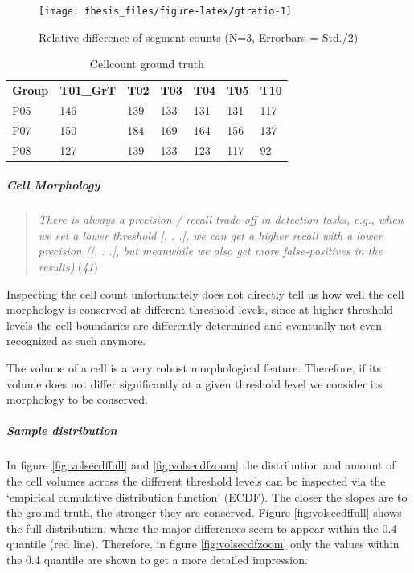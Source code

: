 \documentclass[11pt,singlespacinge,twoside]{reedthesis} %
\begin{document}
\begin{figure}

{\centering \texttt{[image: thesis\_files/figure-latex/gtratio-1]} 

}

\caption[Relative difference of segment counts]{Relative difference of segment counts (N=3, Errorbars = Std./2)}\label{fig:gtratio}
\end{figure}
\begin{table}[!h]

\caption{\label{tab:gtrcellcount}Cellcount ground truth}
\centering
\begin{tabu} to 
\toprule
{}  \textbf{Group} & \textbf{T01\_GrT} & \textbf{T02} & \textbf{T03} & \textbf{T04} & \textbf{T05} & \textbf{T10}\\
P05 & 146 & 139 & 133 & 131 & 131 & 117\\
  P07 & 150 & 184 & 169 & 164 & 156 & 137\\
P08 & 127 & 139 & 133 & 123 & 117 & 92\\
\bottomrule
\end{tabu}
\end{table}
\hypertarget{cell-morphology}{%
\subparagraph{Cell Morphology}\label{cell-morphology}}
\begin{quote}
\emph{There is always a precision / recall trade-off in detection tasks, e.g., when we set a lower threshold {[}. . .{]}, we can get a higher recall with a lower precision ({[}. . .{]}, but meanwhile we also get more false-positives in the results).}(\emph{41})
\end{quote}
Inspecting the cell count unfortunately does not directly tell us how well the cell morphology is conserved at different threshold levels, since at higher threshold levels the cell boundaries are differently determined and eventually not even recognized as such anymore.

\noindent The volume of a cell is a very robust morphological feature. Therefore, if its volume does not differ significantly at a given threshold level we consider its morphology to be conserved.

\hypertarget{sample-distribution}{%
\subparagraph{Sample distribution}\label{sample-distribution}}

In figure \ref{fig:volsecdffull} and \ref{fig:volsecdfzoom} the distribution and amount of the cell volumes across the different threshold levels can be inspected via the `empirical cumulative distribution function' (ECDF). The closer the slopes are to the ground truth, the stronger they are conserved. Figure \ref{fig:volsecdffull} shows the full distribution, where the major differences seem to appear within the 0.4 quantile (red line). Therefore, in figure \ref{fig:volsecdfzoom} only the values within the 0.4 quantile are shown to get a more detailed impression.
\end{document}
